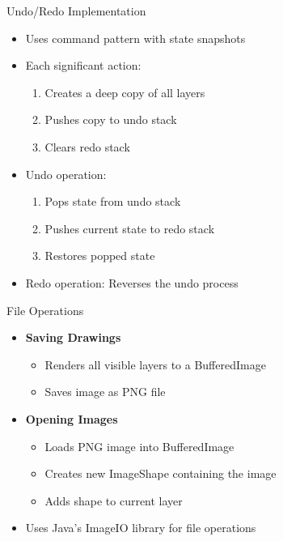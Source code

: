 \documentclass{beamer}
\begin{document}
\begin{frame}{Undo/Redo Implementation}
\begin{itemize}
\item Uses command pattern with state snapshots
\item Each significant action:
  \begin{enumerate}
  \item Creates a deep copy of all layers
  \item Pushes copy to undo stack
  \item Clears redo stack
  \end{enumerate}
\item Undo operation:
  \begin{enumerate}
  \item Pops state from undo stack
  \item Pushes current state to redo stack
  \item Restores popped state
  \end{enumerate}
\item Redo operation: Reverses the undo process
\end{itemize}
\end{frame}

\begin{frame}{File Operations}
\begin{itemize}
\item \textbf{Saving Drawings}
  \begin{itemize}
  \item Renders all visible layers to a BufferedImage
  \item Saves image as PNG file
  \end{itemize}
\item \textbf{Opening Images}
  \begin{itemize}
  \item Loads PNG image into BufferedImage
  \item Creates new ImageShape containing the image
  \item Adds shape to current layer
  \end{itemize}
\item Uses Java's ImageIO library for file operations
\end{itemize}
\end{frame}
\end{document}

